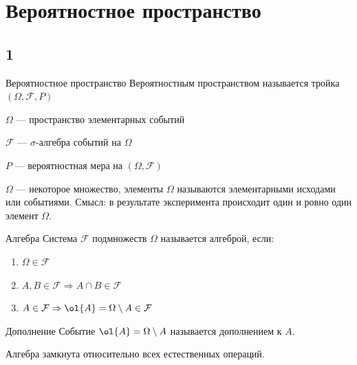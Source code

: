 \section{Вероятностное пространство}

\subsection{1}

\begin{defn}{Вероятностное пространство}{}
    Вероятностным пространством называется тройка \( (\Omega, \mathcal{F}, P) \)

    \( \Omega \) --- пространство элементарных событий

    \( \mathcal{F} \) --- \( \sigma \)-алгебра событий на \( \Omega \)

    \( P \) --- вероятностная мера на \( (\Omega, \mathcal{F}) \)
\end{defn}

\( \Omega \) --- некоторое множество, элементы \( \Omega \) называются элементарными
исходами или событиями.
Смысл: в результате эксперимента происходит один и ровно один элемент \( \Omega \).

\begin{defn}{Алгебра}{}
    Система \( \mathcal{F} \) подмножеств
    \( \Omega \) называется алгеброй, если:
    \begin{enumerate}
        \item
            \( \Omega \in \mathcal{F} \)
        \item
            \( A, B \in \mathcal{F} \Rightarrow A \cap B \in \mathcal{F} \)
        \item
            \( A \in \mathcal{F} \Rightarrow \ol{A} = \Omega \setminus A \in \mathcal{F} \)
    \end{enumerate}
\end{defn}

\begin{defn}{Дополнение}{}
    Событие \( \ol{A} = \Omega \setminus A \) называется
    дополнением к \( A \).
\end{defn}

\begin{exercise}{}{}
    Алгебра замкнута относительно всех естественных операций.
\end{exercise}

